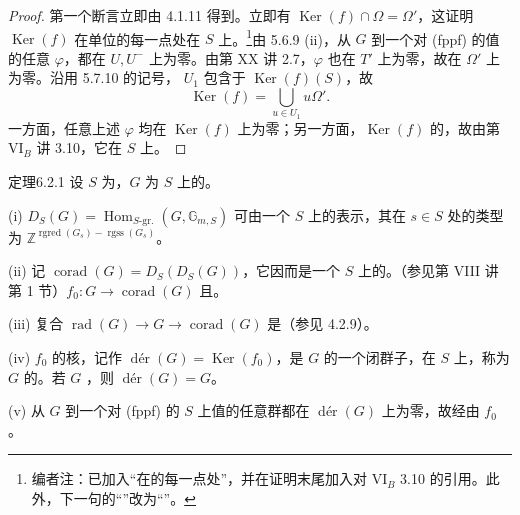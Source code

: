 \begin{proof}
第一个断言立即由 4.1.11 得到。立即有 $\operatorname{Ker}(f)\cap\Omega=\Omega'$，这证明 $\operatorname{Ker}(f)$ 在单位的每一点处在 $S$ 上。\footnote{编者注：已加入“在的每一点处”，并在证明末尾加入对 VI$_B$ 3.10 的引用。此外，下一句的“”改为“”。}由 5.6.9 (ii)，从 $G$ 到一个对 (fppf) 的值的任意 $\varphi$，都在 $U,U^-$ 上为零。由第 XX 讲 2.7，$\varphi$ 也在 $T'$ 上为零，故在 $\Omega'$ 上为零。沿用 5.7.10 的记号， $U_1$ 包含于 $\operatorname{Ker}(f)(S)$，故
\[\operatorname{Ker}(f)=\bigcup_{u\in U_1}u\Omega'.\]
一方面，任意上述 $\varphi$ 均在 $\operatorname{Ker}(f)$ 上为零；另一方面，$\operatorname{Ker}(f)$ 的，故由第 VI$_B$ 讲 3.10，它在 $S$ 上。
\end{proof}
\begin{SGAresult}{定理}{6.2.1}
设 $S$ 为，$G$ 为 $S$ 上的。

(i) $D_S(G)=\operatorname{Hom}_{S\text{-gr.}}(G,\mathbb G_{m,S})$ 可由一个 $S$ 上的表示，其在 $s\in S$ 处的类型为 $\mathbb Z^{\operatorname{rgred}(G_s)-\operatorname{rgss}(G_s)}$。

(ii) 记 $\operatorname{corad}(G)=D_S(D_S(G))$，它因而是一个 $S$ 上的。（参见第 VIII 讲第 1 节）$f_0:G\to\operatorname{corad}(G)$ 且。

(iii) 复合 $\operatorname{rad}(G)\to G\to\operatorname{corad}(G)$ 是（参见 4.2.9）。

(iv) $f_0$ 的核，记作 $\operatorname{d\text{é}r}(G)=\operatorname{Ker}(f_0)$，是 $G$ 的一个闭群子，在 $S$ 上，称为 $G$ 的。若 $G$ ，则 $\operatorname{d\text{é}r}(G)=G$。

(v) 从 $G$ 到一个对 (fppf) 的 $S$ 上值的任意群都在 $\operatorname{d\text{é}r}(G)$ 上为零，故经由 $f_0$ 。
\end{SGAresult}
